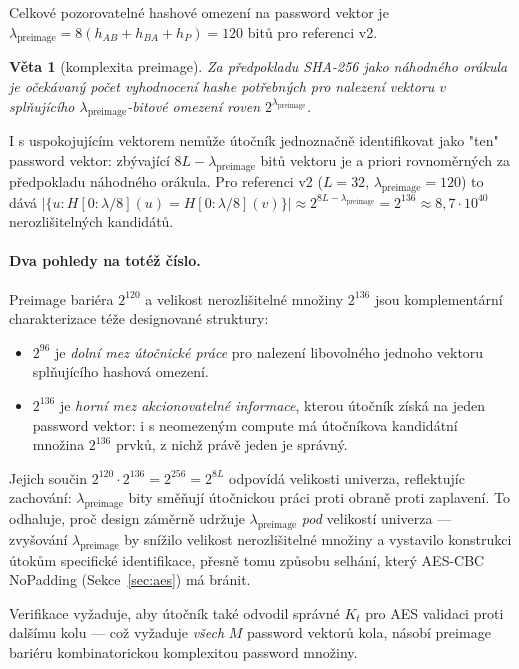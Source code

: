 \documentclass[11pt,a4paper]{article}
\newtheorem{theorem}{V\v{e}ta}
\begin{document}
Celkové pozorovatelné hashové omezení na password vektor je $\lambda_\text{preimage} = 8(h_{AB} + h_{BA} + h_P) = 120$ bitů pro referenci v2.

\begin{theorem}[komplexita preimage]\label{thm:preimage}
Za předpokladu SHA-256 jako náhodného orákula je očekávaný počet vyhodnocení hashe potřebných pro nalezení vektoru $v$ splňujícího $\lambda_\text{preimage}$-bitové omezení roven $2^{\lambda_\text{preimage}}$.
\end{theorem}

I s uspokojujícím vektorem nemůže útočník jednoznačně identifikovat jako "ten" password vektor: zbývající $8L - \lambda_\text{preimage}$ bitů vektoru je a priori rovnoměrných za předpokladu náhodného orákula. Pro referenci v2 ($L = 32$, $\lambda_\text{preimage} = 120$) to dává $|\{u : H[0{:}\lambda/8](u) = H[0{:}\lambda/8](v)\}| \approx 2^{8L - \lambda_\text{preimage}} = 2^{136} \approx 8{,}7 \cdot 10^{40}$ nerozlišitelných kandidátů.

\paragraph{Dva pohledy na totéž číslo.} Preimage bariéra $2^{120}$ a velikost nerozlišitelné množiny $2^{136}$ jsou komplementární charakterizace téže designované struktury:
\begin{itemize}[leftmargin=*]
\item $2^{96}$ je \emph{dolní mez útočnické práce} pro nalezení libovolného jednoho vektoru splňujícího hashová omezení.
\item $2^{136}$ je \emph{horní mez akcionovatelné informace}, kterou útočník získá na jeden password vektor: i s neomezeným compute má útočníkova kandidátní množina $2^{136}$ prvků, z nichž právě jeden je správný.
\end{itemize}
Jejich součin $2^{120} \cdot 2^{136} = 2^{256} = 2^{8L}$ odpovídá velikosti univerza, reflektujíc zachování: $\lambda_\text{preimage}$ bity směňují útočnickou práci proti obraně proti zaplavení. To odhaluje, proč design záměrně udržuje $\lambda_\text{preimage}$ \emph{pod} velikostí univerza --- zvyšování $\lambda_\text{preimage}$ by snížilo velikost nerozlišitelné množiny a vystavilo konstrukci útokům specifické identifikace, přesně tomu způsobu selhání, který AES-CBC NoPadding (Sekce~\ref{sec:aes}) má bránit.

Verifikace vyžaduje, aby útočník také odvodil správné $K_t$ pro AES validaci proti dalšímu kolu --- což vyžaduje \emph{všech} $M$ password vektorů kola, násobí preimage bariéru kombinatorickou komplexitou password množiny.
\end{document}
